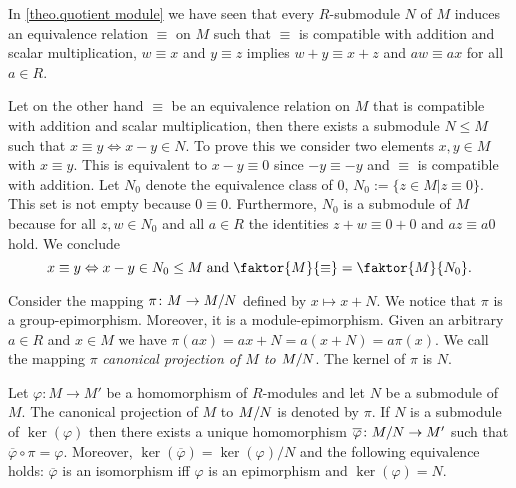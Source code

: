 \begin{rem}
\begin{exlist}
\item In \cref{theo.quotient module} we have seen that every $R$-sub\-mod\-ule $N$ of $M$ induces an equivalence relation $\equiv$ on $M$  such that $\equiv$ is compatible with addition and scalar multiplication, \ie $w\equiv x$ and $y\equiv z$ implies $w+y\equiv x+z$ and $aw\equiv ax$ for all $a\in R$. 

Let on the other hand $\equiv$ be an equivalence relation on $M$ that is compatible with addition and scalar multiplication, then there exists a submodule $N\leq M$ such that $x\equiv y\Leftrightarrow x-y\in N$. To prove this we consider two elements $x,y\in M$ with $x\equiv y$. This is equivalent to $x-y\equiv 0$ since $-y\equiv -y$ and $\equiv$ is compatible with addition. Let $N_0$ denote the equivalence class of 0, \ie $N_0:=\lbrace z\in M|z\equiv 0\rbrace$. This set is not empty because $0\equiv 0$. Furthermore, $N_0$ is a submodule of $M$ because for all $z ,w\in N_0$ and all $a\in R$ the identities $z +w\equiv 0+0$ and $az\equiv a0$ hold. We conclude
\begin{equation*}
x\equiv y\Leftrightarrow x-y\in N_0\leq M \;\text{and}\; \faktor{M}{\equiv}=\faktor{M}{N_0}.
\end{equation*}
\item Consider the mapping $\pi\colon M\rightarrow M/N$ defined by $x\mapsto x+N$. We notice that $\pi$ is a group-epimorphism. Moreover, it is a module-epimorphism. Given an arbitrary $a\in R$ and $x\in M$ we have $\pi(ax)=ax+N=a(x+N)=a\pi(x)$. We call the mapping $\pi$ \emph{canonical projection of $M$ to $M/N$}. The kernel of $\pi$ is $N$.
\end{exlist}
\end{rem}

\begin{thm}\label{theo.Universal Property}
Let $\varphi\colon M \to M'$ be a homomorphism of $R$-modules and let $N$ be a submodule of $M$. The canonical projection of $M$ to $M/N$ is denoted by $\pi$. If $N$ is a submodule of $\ker(\varphi)$ then there exists a unique homomorphism $\overline{\varphi}\colon M/N\rightarrow M'$ such that $\overline{\varphi}\circ\pi=\varphi$. Moreover, $\ker(\overline{\varphi})=\ker(\varphi)/N$ and the following equivalence holds: $\overline{\varphi}$ is an isomorphism iff $\varphi$ is an epimorphism and $\ker(\varphi)=N$.
\end{thm}

